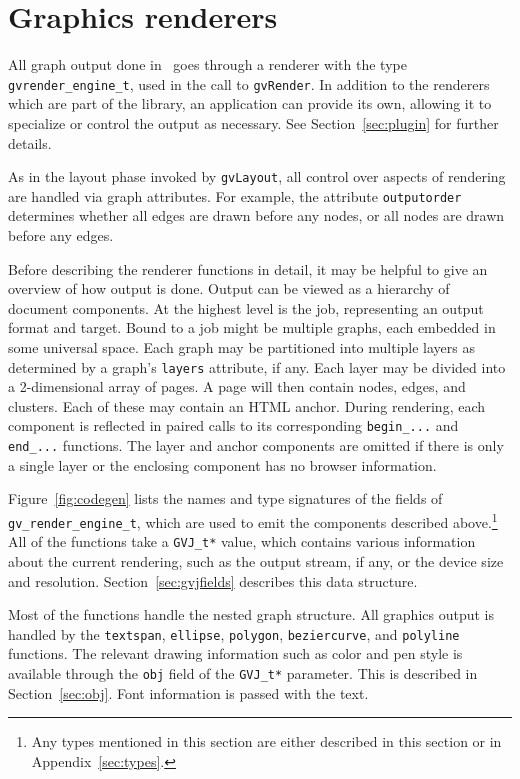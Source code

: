 \section{Graphics renderers}
\label{sec:renderers}

All graph output done in \gviz\ goes through a renderer
with the type {\tt gvrender\_engine\_t}, used in the call
to {\tt gvRender}.
In addition to the renderers which are part of the library, an application
can provide its own, allowing it to specialize or control the output
as necessary. See Section~\ref{sec:plugin} for further details.

As in the layout phase invoked by {\tt gvLayout}, all control over
aspects of rendering are handled via graph attributes. For example,
the attribute {\tt outputorder} determines whether all edges are drawn
before any nodes, or all nodes are drawn before any edges.

Before describing the renderer functions in detail, it may be helpful
to give an overview of how output is done. Output can be viewed as a hierarchy
of document components. At the highest level is the job, representing 
an output format and target. Bound to a job might be multiple graphs,
each embedded in some universal space. Each graph may be partitioned
into multiple layers as determined by a graph's {\tt layers} attribute,
if any. Each layer may be divided into a 2-dimensional array
of pages. A page will then contain nodes, edges, and clusters. Each of
these may contain an HTML anchor.
During rendering, each component
is reflected in paired calls to its corresponding {\tt begin\_...} and
{\tt end\_...} functions. The layer and anchor components are omitted if
there is only a single layer or the enclosing component has no browser
information. 

Figure~\ref{fig:codegen} lists the names and type signatures of
the fields of {\tt gv\_render\_engine\_t}, which are used to emit the components
described above.\footnote{Any types mentioned in this section are
either described in this section or in Appendix~\ref{sec:types}.}
All of the functions take a {\tt GVJ\_t*} value, which
contains various information about the current rendering, such as the
output stream, if any, or the device size and resolution.
Section~\ref{sec:gvjfields} describes this data structure.

Most of the functions handle the nested graph structure.
All graphics output is handled by the {\tt textspan}, {\tt ellipse},
{\tt polygon}, {\tt beziercurve}, and {\tt polyline} functions.
The relevant drawing information such as color and pen style
is available through the {\tt obj} field of the
{\tt GVJ\_t*} parameter. 
This is described in Section~\ref{sec:obj}.
Font information is passed with the text.

